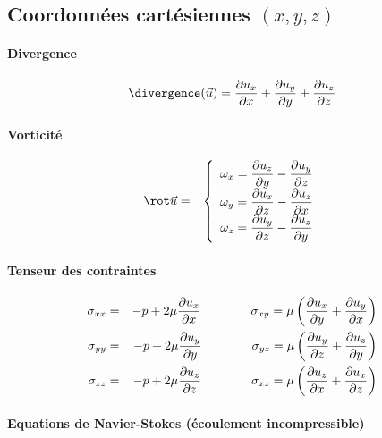 
\subsection{Coordonn\'ees cart\'esiennes $(x,y,z)$}


\paragraph{Divergence}
$$
\divergence (\vec{u}) = \dpa{u_x}{x} + \dpa{u_y}{y} + \dpa{u_z}{z}
$$


\paragraph{Vorticité}

\begin{eqnarray*}
\rot \vec{u} &=&  \left\{ 
\begin{array}{c} 
\displaystyle \omega_x = \dpa{u_z}{y}- \dpa{u_y}{z}\\
\displaystyle \omega_y = \dpa{u_x}{z}- \dpa{u_z}{x}\\
\displaystyle \omega_z = \dpa{u_y}{z}- \dpa{u_z}{y}\\
\end{array}
\right.
\end{eqnarray*}


\paragraph{Tenseur des contraintes}

\begin{eqnarray*}
\sigma_{xx} & = & -p + 2\mu \frac {\partial u_x} {\partial x} \qquad \qquad 
\sigma_{xy} = \mu \left ( \frac {\partial u_x} {\partial y} + \frac {\partial u_y} {\partial x} \right ) \\
\sigma_{yy} & = & -p + 2\mu \frac {\partial u_y} {\partial y} \qquad \qquad 
\sigma_{yz} = \mu \left ( \frac {\partial u_y} {\partial z} + \frac {\partial u_z} {\partial y} \right ) \\
\sigma_{zz} & = & -p + 2\mu \frac {\partial u_z} {\partial z} \qquad \qquad 
\sigma_{xz} = \mu \left ( \frac {\partial u_z} {\partial x} + \frac {\partial u_x} {\partial z} \right ) 
\end{eqnarray*}



\paragraph{Equations de Navier-Stokes (écoulement incompressible)}

